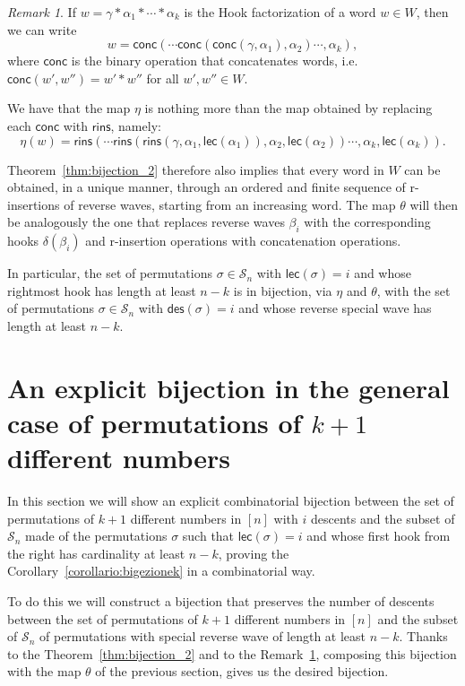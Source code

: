 \documentclass[a4paper]{amsart}
\newcommand{\des}{\mathsf{des}}
\newcommand{\lec}{\mathsf{lec}}
\newcommand{\rins}{\mathsf{rins}}
\newcommand{\conc}{\mathsf{conc}}
\theoremstyle{definition}
\theoremstyle{remark}
\newtheorem{remark}[theorem]{Remark}
\numberwithin{equation}{section}
\begin{document}
\begin{remark}\label{rem:cat_bij_2}
    If $w=\gamma*\alpha_1*\cdots*\alpha_k$ is the Hook factorization of a word $w\in W$, then we can write
    \begin{equation*}
        w=\conc(\cdots\conc(\conc(\gamma,\alpha_1),\alpha_2)\cdots     ,\alpha_k),
    \end{equation*}
    where $\conc$ is the binary operation that concatenates words, i.e. $\conc(w',w'')=w'*w''$ for all $w',w''\in W$.

We have that the map $\eta$ is nothing more than the map obtained by replacing each $\conc$ with $\rins$, namely:
\begin{equation*}
    \eta(w)=\rins(\cdots\rins(\rins(\gamma,\alpha_1,\lec(\alpha_1)),\alpha_2,\lec(\alpha_2))\cdots     ,\alpha_k,\lec(\alpha_k)).
    \end{equation*}

Theorem~\ref{thm:bijection_2} therefore also implies that every word in $W$ can be obtained, in a unique manner, through an ordered and finite sequence of r-insertions of reverse waves, starting from an increasing word. The map $\theta$ will then be analogously the one that replaces reverse waves $\beta_i$ with the corresponding hooks $\delta(\beta_i)$ and r-insertion operations with concatenation operations.

In particular, the set of permutations $\sigma\in\mathcal{S}_n$ with $\lec(\sigma)=i$ and whose rightmost hook has length at least $n-k$ is in bijection, via $\eta$ and $\theta$, with the set of permutations $\sigma\in\mathcal{S}_n$ with $\des(\sigma)=i$ and whose reverse special wave has length at least $n-k$. 
\end{remark}


\section{An explicit bijection in the general case of permutations of \texorpdfstring{$k+1$}{k+1} different numbers}
\label{sec:generalexplicit}
In this section we will show an explicit combinatorial bijection between the set of permutations of $k+1$ different numbers in $[n]$ with $i$ descents and the subset of $\mathcal{S}_n$ made of the permutations $\sigma$ such that $\lec(\sigma)=i$ and whose first hook from the right has cardinality at least $n-k$, proving the Corollary~\ref{corollario:bigezionek} in a combinatorial way.

To do this we will construct a bijection that preserves the number of descents between the set of permutations of $k+1$ different numbers in $[n]$ and the subset of $\mathcal{S}_n$ of permutations with special reverse wave of length at least $n-k$. Thanks to the Theorem~\ref{thm:bijection_2} and to the Remark~\ref{rem:cat_bij_2}, composing this bijection with the map $\theta$ of the previous section, gives us the desired bijection.  
\medskip
\end{document}
